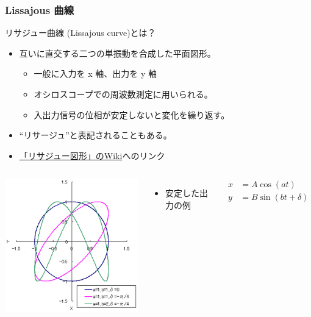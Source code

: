 \documentclass[unicode,12pt]{beamer}%
\begin{document}
\begin{frame}
	\frametitle{Lissajous 曲線}
		\begin{block}{リサジュー曲線 (Lissajous curve)とは？}
			\begin{itemize}
				\item 互いに直交する二つの単振動を合成した平面図形。
				\begin{itemize}
					\item 一般に入力を x 軸、出力を y 軸
					\item オシロスコープでの周波数測定に用いられる。
					\item 入出力信号の位相が安定しないと変化を繰り返す。
				\end{itemize}
				\item “リサージュ”と表記されることもある。
				\item \textcolor{red}{\href{https://ja.wikipedia.org/wiki/リサジュー図形}{「リサジュー図形」のWiki}}へのリンク
			\end{itemize}
		\end{block}

	\begin{columns}[c, onlytextwidth]
				\centering
					\includegraphics[width=\textwidth]{Lissajou.png}	
			\begin{itemize}
				\item 安定した出力の例
			\end{itemize}
			\vspace{-5mm}
			\begin{align*}
				x&=A \cos(at) \\
				y&=B \sin(bt + \delta)
			\end{align*}
	\end{columns}
\end{frame}
\end{document}

